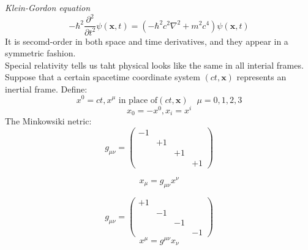 \documentclass[12pt,a4paper]{article}
\numberwithin{equation}{subsection}
\begin{document}
\textit{Klein-Gordon equation}
\begin{equation}
-\hbar^2\frac{\partial^2}{\partial t^2}\psi(\mathbf{x},t)=(-\hbar^2c^2\nabla^2+m^2c^4)\psi(\mathbf{x},t)
\end{equation}
It is secomd-order in both space and time derivatives,
and they appear in a symmetric fashion.\\
Special relativity tells us taht physical looks like the same in all interial frames.
Suppose that a certain spacetime coordinate system $(ct,\mathbf{x})$ represents an inertial frame.
Define:
$$
x^0=ct,x^\mu\text{ in place of} (ct,\mathbf{x})\quad\mu=0,1,2,3
$$
$$
x_0=-x^0,x_i=x^i
$$
The Minkowsiki netric:
\begin{equation}
g_{\mu\nu}=
\begin{pmatrix}
-1&&&\\
&+1&\\
&&+1&\\
&&&+1
\end{pmatrix}
\end{equation}

$$
x_\mu=g_{\mu\nu}x^\nu
$$

\begin{equation}
g_{\mu\nu}=
\begin{pmatrix}
+1&&&\\
&-1&\\
&&-1&\\
&&&-1
\end{pmatrix}
\end{equation}
$$
x^\mu=g^{\mu\nu}x_\nu
$$
\end{document}
